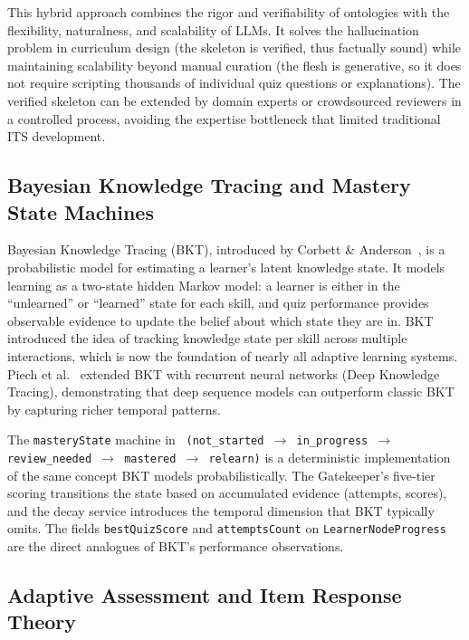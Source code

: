 This hybrid approach combines the rigor and verifiability of ontologies with the flexibility, naturalness, and scalability of LLMs. It solves the hallucination problem in curriculum design (the skeleton is verified, thus factually sound) while maintaining scalability beyond manual curation (the flesh is generative, so it does not require scripting thousands of individual quiz questions or explanations). The verified skeleton can be extended by domain experts or crowdsourced reviewers in a controlled process, avoiding the expertise bottleneck that limited traditional ITS development.

\subsection{Bayesian Knowledge Tracing and Mastery State Machines}
\label{sec:bkt}

Bayesian Knowledge Tracing (BKT), introduced by Corbett \& Anderson~\cite{corbett1994}, is a probabilistic model for estimating a learner's latent knowledge state. It models learning as a two-state hidden Markov model: a learner is either in the \enquote{unlearned} or \enquote{learned} state for each skill, and quiz performance provides observable evidence to update the belief about which state they are in. BKT introduced the idea of tracking knowledge state per skill across multiple interactions, which is now the foundation of nearly all adaptive learning systems. Piech et al.~\cite{piech2015} extended BKT with recurrent neural networks (Deep Knowledge Tracing), demonstrating that deep sequence models can outperform classic BKT by capturing richer temporal patterns.

The \texttt{masteryState} machine in \projectname{}~\texttt{(not\_started \(\rightarrow\) in\_progress \(\rightarrow\) review\_needed \(\rightarrow\) mastered \(\rightarrow\) relearn)} is a deterministic implementation of the same concept BKT models probabilistically. The Gatekeeper's five-tier scoring transitions the state based on accumulated evidence (attempts, scores), and the decay service introduces the temporal dimension that BKT typically omits. The fields \texttt{bestQuizScore} and \texttt{attemptsCount} on \texttt{LearnerNodeProgress} are the direct analogues of BKT's performance observations.

\subsection{Adaptive Assessment and Item Response Theory}
\label{sec:adaptive-assessment}

